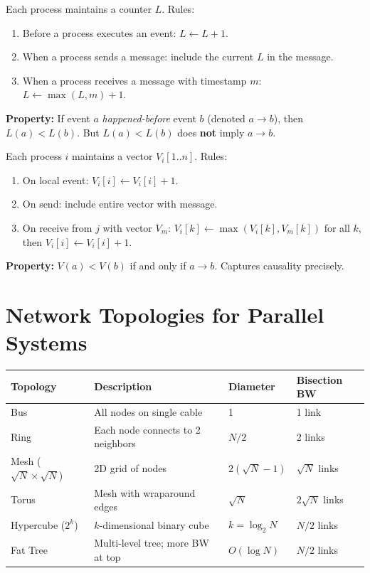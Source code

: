\documentclass[11pt,a4paper]{article}
\begin{document}
\begin{definitionbox}
Each process maintains a counter $L$. Rules:
\begin{enumerate}[leftmargin=*, itemsep=2pt]
  \item Before a process executes an event: $L \gets L + 1$.
  \item When a process sends a message: include the current $L$ in the message.
  \item When a process receives a message with timestamp $m$: $L \gets \max(L, m) + 1$.
\end{enumerate}
\textbf{Property:} If event $a$ \textit{happened-before} event $b$ (denoted $a \to b$), then $L(a) < L(b)$. But $L(a) < L(b)$ does \textbf{not} imply $a \to b$.
\end{definitionbox}

\begin{definitionbox}
Each process $i$ maintains a vector $V_i[1..n]$. Rules:
\begin{enumerate}[leftmargin=*, itemsep=2pt]
  \item On local event: $V_i[i] \gets V_i[i] + 1$.
  \item On send: include entire vector with message.
  \item On receive from $j$ with vector $V_m$: $V_i[k] \gets \max(V_i[k], V_m[k])$ for all $k$, then $V_i[i] \gets V_i[i] + 1$.
\end{enumerate}
\textbf{Property:} $V(a) < V(b)$ if and only if $a \to b$. Captures causality precisely.
\end{definitionbox}

\section{Network Topologies for Parallel Systems}

\begin{longtable}{@{}p{2.8cm}p{4.5cm}p{2.8cm}p{3.8cm}@{}}
\toprule
\rowcolor{primary!15}
\textbf{Topology} & \textbf{Description} & \textbf{Diameter} & \textbf{Bisection BW} \\
\midrule
\endhead
Bus & All nodes on single cable & 1 & 1 link \\
Ring & Each node connects to 2 neighbors & $N/2$ & 2 links \\
Mesh ($\sqrt{N}\times\sqrt{N}$) & 2D grid of nodes & $2(\sqrt{N}-1)$ & $\sqrt{N}$ links \\
Torus & Mesh with wraparound edges & $\sqrt{N}$ & $2\sqrt{N}$ links \\
Hypercube ($2^k$) & $k$-dimensional binary cube & $k = \log_2 N$ & $N/2$ links \\
Fat Tree & Multi-level tree; more BW at top & $O(\log N)$ & $N/2$ links \\
\bottomrule
\end{longtable}
\end{document}
